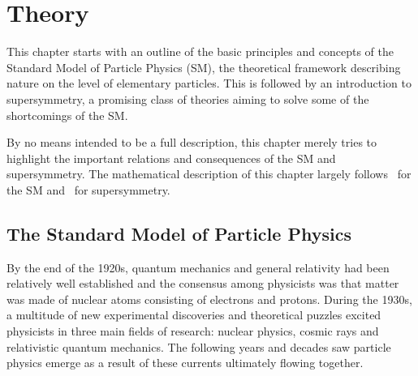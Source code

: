 
\chapter{Theory}

\ifpdf
    \graphicspath{{chapter-theory/Figs/Raster/}{chapter-theory/Figs/PDF/}{chapter-theory/Figs/}}
\else
    \graphicspath{{chapter-theory/Figs/Vector/}{chapter-theory/Figs/}}
\fi

This chapter starts with an outline of the basic principles and concepts of the Standard Model of Particle Physics (SM), the theoretical framework describing nature on the level of elementary particles. This is followed by an introduction to supersymmetry, a promising class of theories aiming to solve some of the shortcomings of the SM.

By no means intended to be a full description, this chapter merely tries to highlight the important relations and consequences of the SM and supersymmetry. The mathematical description of this chapter largely follows~\cite{Brock:1354959, Peskin:1995ev} for the SM and~\cite{Martin:1997ns} for supersymmetry.

\section{The Standard Model of Particle Physics}


By the end of the 1920s, quantum mechanics and general relativity had been relatively well established and the consensus among physicists was that matter was made of nuclear atoms consisting of electrons and protons. During the 1930s, a multitude of new experimental discoveries and theoretical puzzles excited physicists in three main fields of research: nuclear physics, cosmic rays and relativistic quantum mechanics. The following years and decades saw particle physics emerge as a result of these currents ultimately flowing together.

